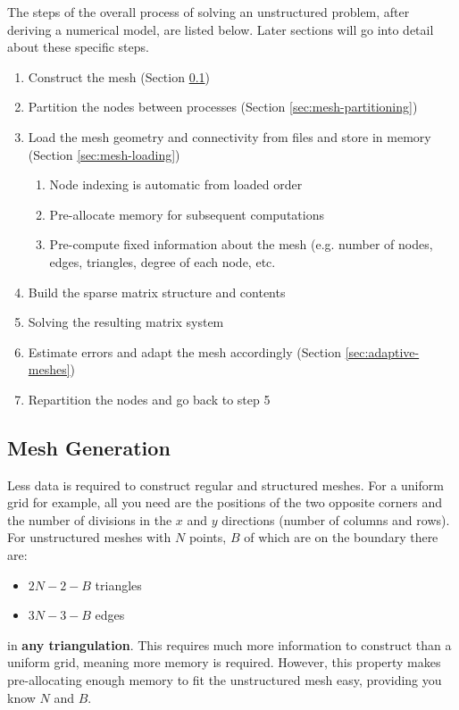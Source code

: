 \documentclass{article}
\begin{document}
The steps of the overall process of solving an unstructured problem, after deriving a numerical model, are listed below. Later sections will go into detail about these specific steps.
\begin{enumerate}
	\item Construct the mesh (Section \ref{sec:mesh-generation})
	\item Partition the nodes between processes  (Section \ref{sec:mesh-partitioning})
	\item Load the mesh geometry and connectivity from files and store in memory (Section \ref{sec:mesh-loading})
	\begin{enumerate}
		\item Node indexing is automatic from loaded order
		\item Pre-allocate memory for subsequent computations
		\item Pre-compute fixed information about the mesh (e.g. number of nodes, edges, triangles, degree of each node, etc.
	\end{enumerate}
	\item Build the sparse matrix structure and contents
	\item Solving the resulting matrix system
	\item Estimate errors and adapt the mesh accordingly (Section \ref{sec:adaptive-meshes})
	\item Repartition the nodes and go back to step 5
\end{enumerate}

\subsection{Mesh Generation}
\label{sec:mesh-generation}

Less data is required to construct regular and structured meshes. For a uniform grid for example, all you need are the positions of the two opposite corners and the number of divisions in the $x$ and $y$ directions (number of columns and rows). For unstructured meshes with $N$ points, $B$ of which are on the boundary there are:
\begin{itemize}
	\item $2N - 2 - B$ triangles
	\item $3N - 3 - B$ edges
\end{itemize}
in \textbf{any triangulation}. This requires much more information to construct than a uniform grid, meaning more memory is required. However, this property makes pre-allocating enough memory to fit the unstructured mesh easy, providing you know $N$ and $B$.
\end{document}
